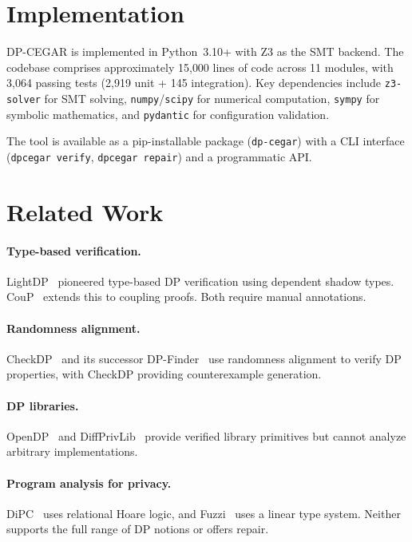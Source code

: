 \documentclass[sigplan,screen,nonacm]{acmart}
\begin{document}
\section{Implementation}
\label{sec:impl}

\textsc{DP-CEGAR} is implemented in Python~3.10+ with Z3 as the SMT backend.
The codebase comprises approximately 15{,}000 lines of code across 11 modules,
with 3{,}064 passing tests (2{,}919 unit + 145 integration). Key dependencies
include \texttt{z3-solver} for SMT solving, \texttt{numpy}/\texttt{scipy} for
numerical computation, \texttt{sympy} for symbolic mathematics, and
\texttt{pydantic} for configuration validation.

The tool is available as a pip-installable package (\texttt{dp-cegar}) with a
CLI interface (\texttt{dpcegar verify}, \texttt{dpcegar repair}) and a
programmatic API.

\section{Related Work}
\label{sec:related}

\paragraph{Type-based verification.}
LightDP~\cite{zhang2017lightdp} pioneered type-based DP verification using
dependent shadow types. CouP~\cite{barthe2021coup} extends this to coupling
proofs. Both require manual annotations.

\paragraph{Randomness alignment.}
CheckDP~\cite{wang2020checkdp} and its successor
DP-Finder~\cite{bichsel2018dpfinder} use randomness alignment to verify DP
properties, with CheckDP providing counterexample generation.

\paragraph{DP libraries.}
OpenDP~\cite{gaboardi2020opendp} and DiffPrivLib~\cite{holohan2019diffprivlib}
provide verified library primitives but cannot analyze arbitrary implementations.

\paragraph{Program analysis for privacy.}
DiPC~\cite{barthe2020dipc} uses relational Hoare logic, and
Fuzzi~\cite{zhang2019fuzzi} uses a linear type system. Neither supports
the full range of DP notions or offers repair.
\end{document}
